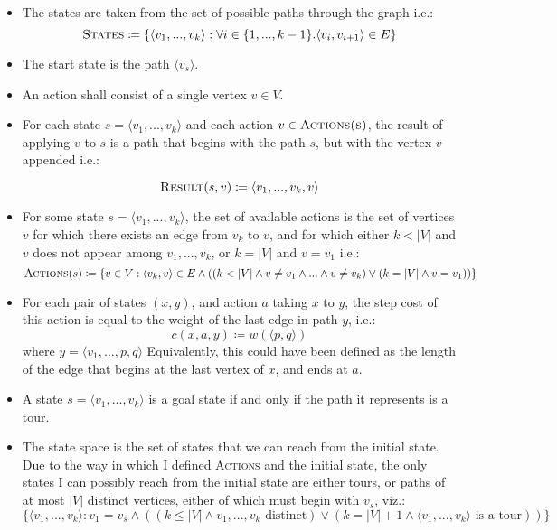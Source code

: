 \documentclass[a4paper,12pt]{scrartcl}
\begin{document}
\begin{itemize}
    \item The states are taken from the set of possible paths through the graph i.e.:
        \[
            \textsc{States} \coloneqq \{ \langle v_1, ..., v_k \rangle : \forall i \in \{1, ..., k-1 \} . \langle v_i, v_{i+1} \rangle \in E \}
        \]
    \item The start state is the path $\langle v_s \rangle$.
    \item An action shall consist of a single vertex $v \in V$.
    \item For each state $s = \langle v_1, ..., v_k\rangle$ and each action $v \in \textsc{Actions(s)}$, the result of applying $v$ to $s$ is a path that begins with the path $s$, but with the vertex $v$ appended i.e.:

        \[
            \textsc{Result}(s, v) \coloneqq \langle v_1, ..., v_k, v \rangle
        \]
    \item For some state $s = \langle v_1, ..., v_k \rangle$, the set of available actions is the set of vertices $v$ for which there exists an edge from $v_k$ to $v$, and for which either $k < |V|$ and $v$ does not appear among $v_1, ..., v_k$, or $k = |V|$ and $v = v_1$ i.e.:
        \[
            \textsc{Actions}(s) \coloneqq \{ v \in V : \langle v_k, v \rangle \in E \land ((k < |V| \land v \neq v_1 \land ... \land v \neq v_k) \lor (k = |V| \land v = v_1)) \}
        \]
    \item For each pair of states $(x, y)$, and action $a$ taking $x$ to $y$, the step cost of this action is equal to the weight of the last edge in path $y$, i.e.:
        \[
            c(x, a, y) \coloneqq w(\langle p, q \rangle)
        \]
        where $y = \langle v_1, ..., p, q \rangle$ Equivalently, this could have been defined as the length of the edge that begins at the last vertex of $x$, and ends at $a$.
    \item A state $s = \langle v_1, ..., v_k \rangle$ is a goal state if and only if the path it represents is a tour.
    \item The state space is the set of states that we can reach from the initial state. Due to the way in which I defined \textsc{Actions} and the initial state, the only states I can possibly reach from the initial state are either tours, or paths of at most $|V|$ distinct vertices, either of which must begin with $v_s$, viz.:
    \[
        \{ \langle v_1, ..., v_k \rangle : v_1 = v_s \land ((k \leq |V| \land v_1, ..., v_k \text{ distinct}) \lor (k = |V|+1 \land \langle v_1, ..., v_k \rangle \text{ is a tour})) \}
    \]
\end{itemize}
\end{document}
